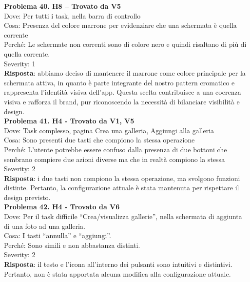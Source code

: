 \documentclass{article}
\begin{document}
\noindent \textbf{Problema 40. H8 – Trovato da V5} \\
Dove: Per tutti i task, nella barra di controllo \\
Cosa: Presenza del colore marrone per evidenziare che una schermata è quella corrente \\
Perché: Le schermate non correnti sono di colore nero e quindi risaltano di più di quella corrente. \\
Severity: 1 \\
\textbf{Risposta}: abbiamo deciso di mantenere il marrone come colore principale per la schermata attiva, in quanto è parte integrante del nostro pattern cromatico e rappresenta l’identità visiva dell’app. Questa scelta contribuisce a una coerenza visiva e rafforza il brand, pur riconoscendo la necessità di bilanciare visibilità e design.\\

\noindent \textbf{Problema 41. H4 - Trovato da V1, V5} \\
Dove: Task complesso, pagina Crea una galleria, Aggiungi alla galleria \\
Cosa: Sono presenti due tasti che compiono la stessa operazione \\
Perché: L’utente potrebbe essere confuso dalla presenza di due bottoni che sembrano compiere due azioni diverse ma che in realtà compiono la stessa \\
Severity: 2 \\
\textbf{Risposta}: i due tasti non compiono la stessa operazione, ma svolgono funzioni distinte. Pertanto, la configurazione attuale è stata mantenuta per rispettare il design previsto.\\

\noindent \textbf{Problema 42. H4 - Trovato da V6} \\
Dove: Per il task difficile “Crea/visualizza gallerie”, nella schermata di aggiunta di una foto ad una galleria. \\
Cosa: I tasti “annulla” e “aggiungi”. \\
Perché: Sono simili e non abbastanza distinti. \\
Severity: 2 \\
\textbf{Risposta}: il testo e l’icona all’interno dei pulsanti sono intuitivi e distintivi. Pertanto, non è stata apportata alcuna modifica alla configurazione attuale.\\
\end{document}
